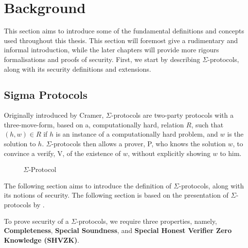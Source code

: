 \chapter{Background}
\label{ch:background}
This section aims to introduce some of the fundamental definitions and concepts
used throughout this thesis. This section will foremost give a rudimentary and
informal introduction, while the later chapters will provide more rigours
formalisations and proofs of security.
First, we start by describing $\Sigma$-protocols, along with its security
definitions and extensions.


\section{Sigma Protocols}
\label{sec:background:sigma_protocols}
Originally introduced by Cramer, $\Sigma$-protocols are two-party protocols with a
three-move-form, based on a, computationally hard, relation $R$, such that $(h, w) \in R$
if $h$ is an instance of a computationally hard problem, and $w$ is
the solution to $h$. $\Sigma$-protocols then allows a prover, P, who knows the
solution $w$, to convince a verify, V, of the existence of $w$, without
explicitly showing $w$ to him.

\begin{figure}[ht]
  \centering
  \caption{\label{fig:proto_sigma} $\Sigma$-Protocol}
\end{figure}


The following section aims to introduce the definition of $\Sigma$-protocols,
along with its notions of security. The following section is based on the
presentation of $\Sigma$-protocols by \citet{on-sigma-protocols}.


\begin{definition}
\label{def:sigma:sec}
To prove security of a $\Sigma$-protocols, we require three properties, namely,
\textbf{Completeness}, \textbf{Special Soundness}, and \textbf{Special Honest Verifier Zero Knowledge (SHVZK)}.
\end{definition}

